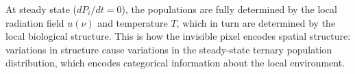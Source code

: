 \documentclass[11pt,twocolumn,a4paper]{article}
\begin{document}
At steady state ($dP_i/dt = 0$), the populations are fully determined by the local radiation field $u(\nu)$ and temperature $T$, which in turn are determined by the local biological structure.
This is how the invisible pixel encodes spatial structure: variations in structure cause variations in the steady-state ternary population distribution, which encodes categorical information about the local environment.

\end{document}
